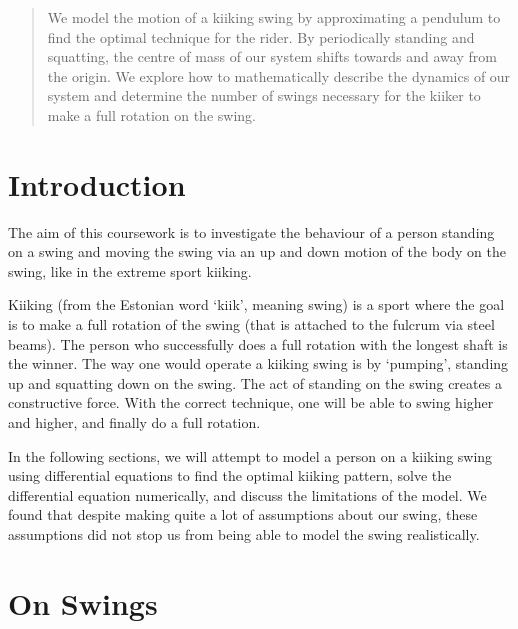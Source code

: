 \documentclass[12pt]{article}
\begin{document}
\begin{abstract}
    We model the motion of a kiiking swing by approximating a pendulum to find the optimal technique for the rider.  By periodically standing and squatting, the centre of mass of our system shifts towards and away from the origin.  We explore how to mathematically describe the dynamics of our system and determine the number of swings necessary for the kiiker to make a full rotation on the swing.
\end{abstract}

\section{Introduction}
The aim of this coursework is to investigate the behaviour of a person standing on a swing and moving the swing via an up and down motion of the body on the swing, like in the extreme sport kiiking.

Kiiking (from the Estonian word `kiik', meaning swing) is a sport where the goal is to make a full rotation of the swing (that is attached to the fulcrum via steel beams). The person who successfully does a full rotation with the longest shaft is the winner. The way one would operate a kiiking swing is by `pumping', standing up and squatting down on the swing. The act of standing on the swing creates a constructive force. With the correct technique, one will be able to swing higher and higher, and finally do a full rotation.

In the following sections, we will attempt to model a person on a kiiking swing using differential equations to find the optimal kiiking pattern, solve the differential equation numerically, and discuss the limitations of the model. We found that despite making quite a lot of assumptions about our swing, these assumptions did not stop us from being able to model the swing realistically. %

\section{On Swings}

\end{document}
